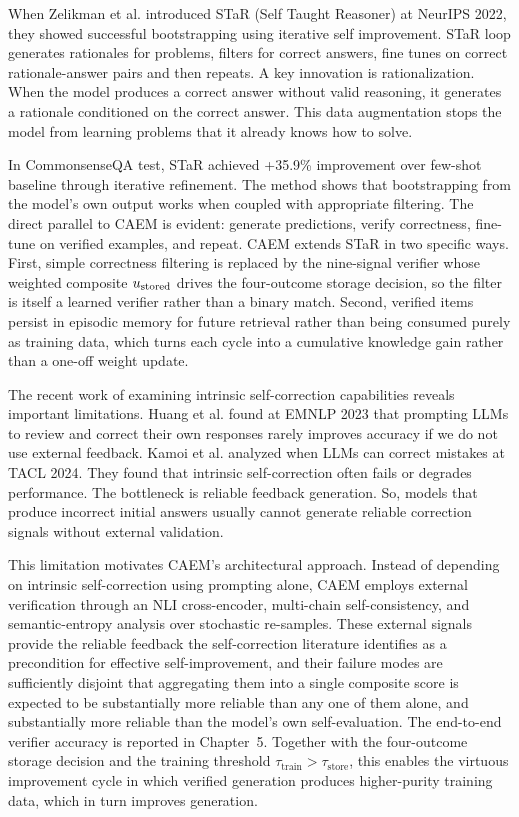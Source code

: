 When Zelikman et al. \cite{NEURIPS2022_639a9a17} introduced STaR (Self Taught Reasoner) at NeurIPS 2022, they showed successful bootstrapping using iterative self improvement. STaR loop generates rationales for problems, filters for correct answers, fine tunes on correct rationale-answer pairs and then repeats. A key innovation is rationalization. When the model produces a correct answer without valid reasoning, it generates a rationale conditioned on the correct answer. This data augmentation stops the model from learning problems that it already knows how to solve.

In CommonsenseQA test, STaR achieved +35.9\% improvement over few-shot baseline through iterative refinement. The method shows that bootstrapping from the model's own output works when coupled with appropriate filtering. The direct parallel to CAEM is evident: generate predictions, verify correctness, fine-tune on verified examples, and repeat. CAEM extends STaR in two specific ways. First, simple correctness filtering is replaced by the nine-signal verifier whose weighted composite $u_{\text{stored}}$ drives the four-outcome storage decision, so the filter is itself a learned verifier rather than a binary match. Second, verified items persist in episodic memory for future retrieval rather than being consumed purely as training data, which turns each cycle into a cumulative knowledge gain rather than a one-off weight update.

The recent work of examining intrinsic self-correction capabilities reveals important limitations. Huang et al. \cite{huang-etal-2023-large} found at EMNLP 2023 that prompting LLMs to review and correct their own responses rarely improves accuracy if we do not use external feedback. Kamoi et al. \cite{kamoi-etal-2024-llms} analyzed when LLMs can correct mistakes at TACL 2024. They found that intrinsic self-correction often fails or degrades performance. The bottleneck is reliable feedback generation. So, models that produce incorrect initial answers usually cannot generate reliable correction signals without external validation. 

This limitation motivates CAEM's architectural approach. Instead of depending on intrinsic self-correction using prompting alone, CAEM employs external verification through an NLI cross-encoder, multi-chain self-consistency, and semantic-entropy analysis over stochastic re-samples. These external signals provide the reliable feedback the self-correction literature identifies as a precondition for effective self-improvement, and their failure modes are sufficiently disjoint that aggregating them into a single composite score is expected to be substantially more reliable than any one of them alone, and substantially more reliable than the model's own self-evaluation. The end-to-end verifier accuracy is reported in Chapter~5. Together with the four-outcome storage decision and the training threshold $\tau_{\text{train}} > \tau_{\text{store}}$, this enables the virtuous improvement cycle in which verified generation produces higher-purity training data, which in turn improves generation.

